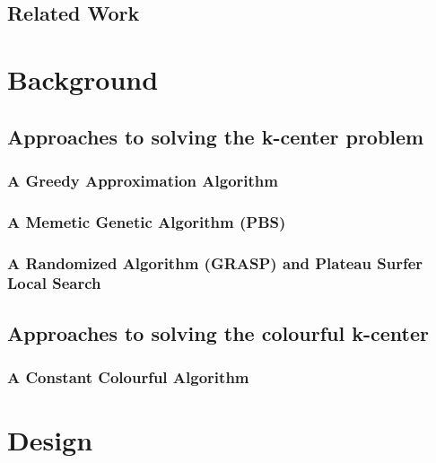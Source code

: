 \documentclass{article}
\begin{document}
    \subsection{Related Work}
    

\section{Background}\label{section:background}
\subsection{Approaches to solving the k-center problem}


    \subsubsection{A Greedy Approximation Algorithm}\label{section:greedy}
    
    
    \subsubsection{A Memetic Genetic Algorithm (PBS)}\label{section:pbs}
    
    
    \subsubsection{A Randomized Algorithm (GRASP) and Plateau Surfer Local Search}\label{section:plateau_surfer}
    

\subsection{Approaches to solving the colourful k-center}

    \subsubsection{A Constant Colourful Algorithm}\label{section:colourful_k_center}
    

\section{Design}\label{section:design}
\end{document}
